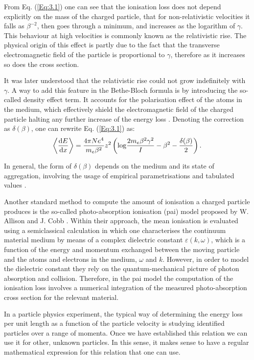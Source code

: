 From Eq. (\ref{Eq:3.1}) one can see that the ionisation loss does not depend explicitly on the mass of the charged particle, that for non-relativistic velocities it falls as $\beta^{-2}$, then goes through a minimum, and increases as the logarithm of $\gamma$. This behaviour at high velocities is commonly known as the relativistic rise. The physical origin of this effect is partly due to the fact that the transverse electromagnetic field of the particle is proportional to $\gamma$, therefore as it increases so does the cross section.

It was later understood that the relativistic rise could not grow indefinitely with $\gamma$. A way to add this feature in the Bethe-Bloch formula is by introducing the so-called density effect term. It accounts for the polarisation effect of the atoms in the medium, which effectively shield the electromagnetic field of the charged particle halting any further increase of the energy loss \cite{Fermi1940}. Denoting the correction as $\delta(\beta)$, one can rewrite Eq. (\ref{Eq:3.1}) as:
\begin{equation}\label{Eq:3.2}
    \expval{\frac{\mathrm{d}E}{\mathrm{d}x}} = \frac{4 \pi N e^{4}}{m_{e}\beta^{2}} z^{2} \left(\mathrm{log} \frac{2m_{e}\beta^{2}\gamma^{2}}{I} - \beta^{2}-\frac{\delta(\beta)}{2}\right).
\end{equation}

In general, the form of $\delta(\beta)$ depends on the medium and its state of aggregation, involving the usage of empirical parametrisations and tabulated values \cite{Sternheimer1984}.

Another standard method to compute the amount of ionisation a charged particle produces is the so-called photo-absorption ionisation (\gls{pai}) model proposed by W. Allison and J. Cobb \cite{Allison1980}. Within their approach, the mean ionisation is evaluated using a semiclassical calculation in which one characterises the continuum material medium by means of a complex dielectric constant $\varepsilon(k, \omega)$, which is a function of the energy and momentum exchanged between the moving particle and the atoms and electrons in the medium, $\omega$ and $k$. However, in order to model the dielectric constant they rely on the quantum-mechanical picture of photon absorption and collision. Therefore, in the \gls{pai} model the computation of the ionisation loss involves a numerical integration of the measured photo-absorption cross section for the relevant material.

In a particle physics experiment, the typical way of determining the energy loss per unit length as a function of the particle velocity is studying identified particles over a range of momenta. Once we have established this relation we can use it for other, unknown particles. In this sense, it makes sense to have a regular mathematical expression for this relation that one can use.

